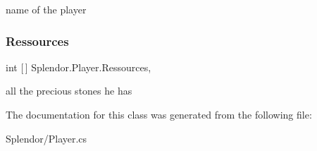 name of the player 

\mbox{\label{class_splendor_1_1_player_a1c5ccd2470e3bbc84e9a156bc323bfd0}} 
\subsubsection{\texorpdfstring{Ressources}{Ressources}}
{\footnotesize\ttfamily int \mbox{[}$\,$\mbox{]} Splendor.\+Player.\+Ressources\hspace{0.3cm}{\ttfamily [get]}, {\ttfamily [set]}}



all the precious stones he has 



The documentation for this class was generated from the following file\+:\begin{DoxyCompactItemize}
\item 
Splendor/Player.\+cs\end{DoxyCompactItemize}
